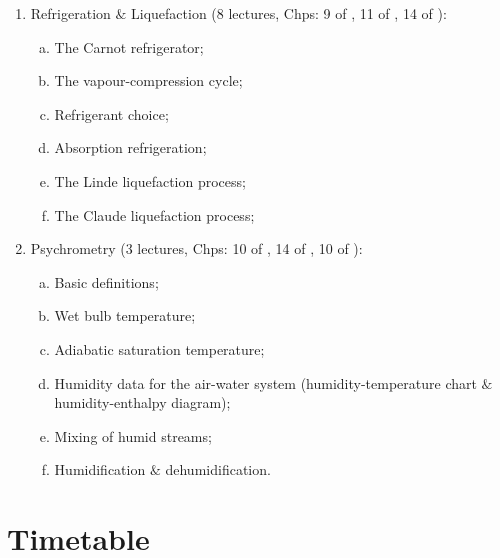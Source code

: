 \documentclass[11pt,oneside,a4paper]{article}
\begin{document}
\begin{enumerate}[{\bf Module 1:}]
\begin{enumerate}[(a)]
\end{enumerate}
%
\item Refrigeration $\&$ Liquefaction (8 lectures, Chps: 9 of \cite{smith_2001}, 11 of \cite{cengel_2010}, 14 of \cite{rajput_2007}):
\begin{enumerate}[(a)]
\item The Carnot refrigerator; 
\item The vapour-compression cycle; 
\item Refrigerant choice; 
\item Absorption refrigeration; 
\item The Linde liquefaction process; 
\item The Claude liquefaction process;
\end{enumerate}
%
\item Psychrometry (3 lectures, Chps: 10 of \cite{muller_2009}, 14 of \cite{cengel_2010}, 10 of \cite{rajput_2007}): 
\begin{enumerate}[(a)]
\item Basic definitions; 
\item Wet bulb temperature; 
\item Adiabatic saturation temperature; 
\item Humidity data for the air-water system (humidity-temperature chart $\&$ humidity-enthalpy diagram); 
\item Mixing of humid streams; 
\item Humidification $\&$ dehumidification.
\end{enumerate}

\end{enumerate}

\section{Timetable}
\end{document}
